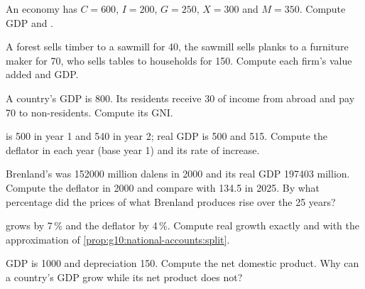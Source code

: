 \begin{exercise}[$\star$]\label{exo:g10:national-accounts:3}
An economy has $C = 600$, $I = 200$, $G = 250$, $X = 300$ and $M = 350$. Compute GDP and .
\end{exercise}

\begin{exercise}[$\star$]\label{exo:g10:national-accounts:4}
A forest sells timber to a sawmill for 40, the sawmill sells planks to a furniture maker for 70, who sells tables to households for 150. Compute each firm's value
added and GDP.
\end{exercise}

\begin{exercise}[$\star$]\label{exo:g10:national-accounts:5}
A country's GDP is 800. Its residents receive 30 of income from abroad and pay 70 to non-residents. Compute its GNI.
\end{exercise}

\begin{exercise}[$\star\star$]\label{exo:g10:national-accounts:6}
 is 500 in year 1 and 540 in year 2; real GDP is 500 and 515. Compute the deflator in each year (base year 1) and its rate of increase.
\end{exercise}

\begin{exercise}[$\star\star$]\label{exo:g10:national-accounts:7}
Brenland's  was \num{152000} million dalens in 2000 and its real GDP \num{197403} million. Compute the deflator in 2000 and compare with 134.5 in 2025. By
what percentage did the prices of what Brenland produces rise over the 25 years?
\end{exercise}

\begin{exercise}[$\star\star$]\label{exo:g10:national-accounts:8}
 grows by 7\,\% and the deflator by 4\,\%. Compute real growth exactly and with the approximation of \cref{prop:g10:national-accounts:split}.
\end{exercise}

\begin{exercise}[$\star\star$]\label{exo:g10:national-accounts:9}
GDP is \num{1000} and depreciation 150. Compute the net domestic product. Why can a country's GDP grow while its net product does not?
\end{exercise}

